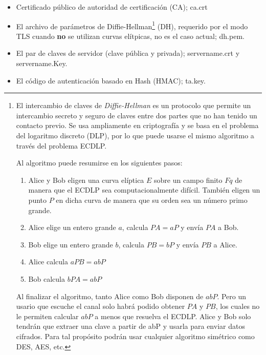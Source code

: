 \documentclass[a4paper, 11pt, titlepage]{article}
\begin{document}
            \begin{itemize}
                \item Certificado público de autoridad de certificación (CA); ca.crt
                \item El archivo de parámetros de Diffie-Hellman\footnote{
        
                    El intercambio de claves de \textit{Diffie-Hellman} es un protocolo que permite un
                    intercambio secreto y seguro de claves entre dos partes que no han
                    tenido un contacto previo. Se usa ampliamente en criptografía y se basa
                    en el problema del logaritmo discreto (DLP), por lo que puede usarse
                    el mismo algoritmo a través del problema ECDLP.
                    
                    Al algoritmo puede resumirse en los siguientes pasos:
                    
                    \begin{enumerate}
                        \item Alice y Bob eligen una curva elíptica $E$ sobre un campo finito $Fq$ de
                        manera que el ECDLP sea computacionalmente difícil. También eligen un
                        punto $P$ en dicha curva de manera que su orden sea un número primo
                        grande.
                        \item Alice elige un entero grande $a$, calcula $PA=aP$ y envía $PA$ a Bob.
                        \item Bob elige un entero grande $b$, calcula $PB=bP$ y envía $PB$ a Alice.
                        \item Alice calcula $aPB=abP$
                        \item Bob calcula $bPA=abP$
        
                    \end{enumerate}
        
                    Al finalizar el algoritmo, tanto Alice como Bob disponen de $abP$. Pero un
                    usario que escuche el canal solo habrá podido obtener $PA$ y $PB$, los
                    cuales no le permiten calcular $abP$ a menos que resuelva el ECDLP. Alice
                    y Bob solo tendrán que extraer una clave a partir de abP y usarla para
                    enviar datos cifrados. Para tal propósito podrán usar cualquier
                    algoritmo simétrico como DES, AES, etc.
        
                } (DH), requerido por el modo TLS cuando \textbf{no} se utilizan curvas elítpicas, 
                no es el caso actual; dh.pem.
                \item El par de claves de servidor (clave pública y privada); servername.crt y servername.Key.
                \item El código de autenticación basado en Hash (HMAC); ta.key.
            \end{itemize}
        
\end{document}
